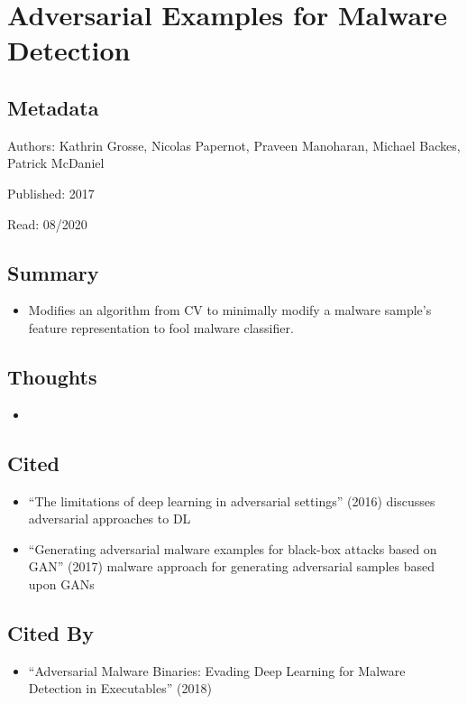 \documentclass{article}
\begin{document}
\section*{Adversarial Examples for Malware Detection}

\subsection*{Metadata}

\noindent Authors: Kathrin Grosse, Nicolas Papernot, Praveen Manoharan, Michael Backes, Patrick McDaniel 

\noindent Published: 2017

\noindent Read: 08/2020

\subsection*{Summary}
\begin{itemize}
\item Modifies an algorithm from CV to minimally modify a malware sample's feature representation to fool malware classifier.
\end{itemize}

\subsection*{Thoughts}
\begin{itemize}
\item
\end{itemize}

\subsection*{Cited}
\begin{itemize}
\item ``The limitations of deep learning in adversarial settings'' (2016) discusses adversarial approaches to DL
\item ``Generating adversarial malware examples for black-box attacks based on GAN'' (2017) malware approach for generating adversarial samples based upon GANs
\end{itemize}

\subsection*{Cited By}
\begin{itemize}
\item ``Adversarial Malware Binaries: Evading Deep Learning for Malware Detection in Executables'' (2018) 
\end{itemize}
\end{document}
